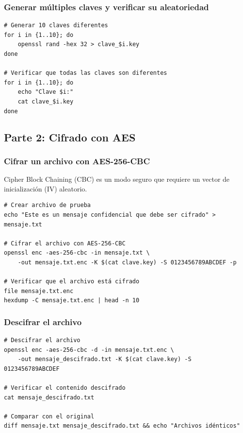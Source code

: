 \documentclass[11pt,a4paper]{article}
\begin{document}
\subsubsection{Generar múltiples claves y verificar su aleatoriedad}

\begin{lstlisting}[caption={Generar y verificar múltiples claves}]
# Generar 10 claves diferentes
for i in {1..10}; do
    openssl rand -hex 32 > clave_$i.key
done

# Verificar que todas las claves son diferentes
for i in {1..10}; do
    echo "Clave $i:"
    cat clave_$i.key
done
\end{lstlisting}

\subsection{Parte 2: Cifrado con AES}

\subsubsection{Cifrar un archivo con AES-256-CBC}

Cipher Block Chaining (CBC) es un modo seguro que requiere un vector de inicialización (IV) aleatorio.

\begin{lstlisting}[caption={Cifrado de archivo con AES-256-CBC}]
# Crear archivo de prueba
echo "Este es un mensaje confidencial que debe ser cifrado" > mensaje.txt

# Cifrar el archivo con AES-256-CBC
openssl enc -aes-256-cbc -in mensaje.txt \
    -out mensaje.txt.enc -K $(cat clave.key) -S 0123456789ABCDEF -p

# Verificar que el archivo está cifrado
file mensaje.txt.enc
hexdump -C mensaje.txt.enc | head -n 10
\end{lstlisting}

\subsubsection{Descifrar el archivo}

\begin{lstlisting}[caption={Descifrado de archivo}]
# Descifrar el archivo
openssl enc -aes-256-cbc -d -in mensaje.txt.enc \
    -out mensaje_descifrado.txt -K $(cat clave.key) -S 0123456789ABCDEF

# Verificar el contenido descifrado
cat mensaje_descifrado.txt

# Comparar con el original
diff mensaje.txt mensaje_descifrado.txt && echo "Archivos idénticos"
\end{lstlisting}
\end{document}
